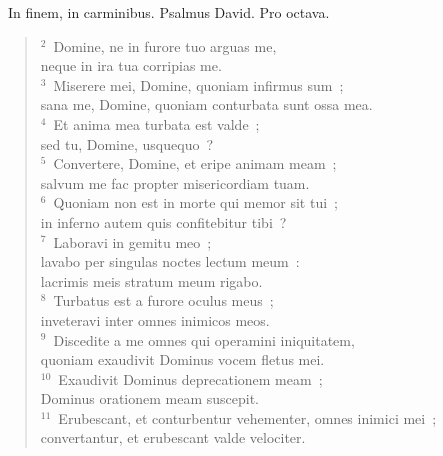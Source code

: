 ~\lettrine[lines=10,image=true,loversize=0.05,lraise=-0.03]{I}{}n finem, in carminibus. Psalmus David. Pro octava.
\begin{flushleft}\begin{verse}\vspace{6pt}${}^{2}$~Domine, ne in furore tuo arguas me,\\ neque in ira tua corripias me.\\
${}^{3}$~Miserere mei, Domine, quoniam infirmus sum~;\\ sana me, Domine, quoniam conturbata sunt ossa mea.\\
${}^{4}$~Et anima mea turbata est valde~;\\ sed tu, Domine, usquequo~?\\
${}^{5}$~Convertere, Domine, et eripe animam meam~;\\ salvum me fac propter misericordiam tuam.\\
${}^{6}$~Quoniam non est in morte qui memor sit tui~;\\ in inferno autem quis confitebitur tibi~?\\
${}^{7}$~Laboravi in gemitu meo~;\\ lavabo per singulas noctes lectum meum~:\\ lacrimis meis stratum meum rigabo.\\
${}^{8}$~Turbatus est a furore oculus meus~;\\ inveteravi inter omnes inimicos meos.\\
${}^{9}$~Discedite a me omnes qui operamini iniquitatem,\\ quoniam exaudivit Dominus vocem fletus mei.\\
${}^{10}$~Exaudivit Dominus deprecationem meam~;\\ Dominus orationem meam suscepit.\\
${}^{11}$~Erubescant, et conturbentur vehementer, omnes inimici mei~;\\ convertantur, et erubescant valde velociter.\end{verse}\end{flushleft}


